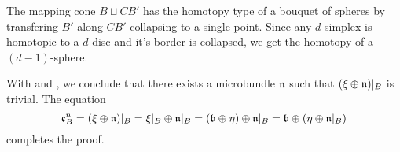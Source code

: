 \begin{myproof}
\begin{enumerate}
        The mapping cone $B \sqcup CB'$ has the homotopy type of a bouquet of spheres
        by transfering $B'$ along $CB'$ collapsing to a single point.
        Since any $d$-simplex is homotopic to a $d$-disc and it's border is collapsed, we get the homotopy of a $(d - 1)$-sphere.
        
        With  and , we conclude that there exists a microbundle $\mathfrak{n}$ such that $(\xi \oplus \mathfrak{n})\vert_{B}$ is trivial.
        The equation
        \[
            \mathfrak{e}^{n}_{B}
            = (\xi \oplus \mathfrak{n})\vert_{B}
            = \xi\vert_{B} \oplus \mathfrak{n}\vert_{B}
            = (\mathfrak{b} \oplus \eta) \oplus \mathfrak{n}\vert_{B}
            = \mathfrak{b} \oplus (\eta \oplus \mathfrak{n}\vert_{B})
        \]
        completes the proof.
    \end{enumerate}
\end{myproof}